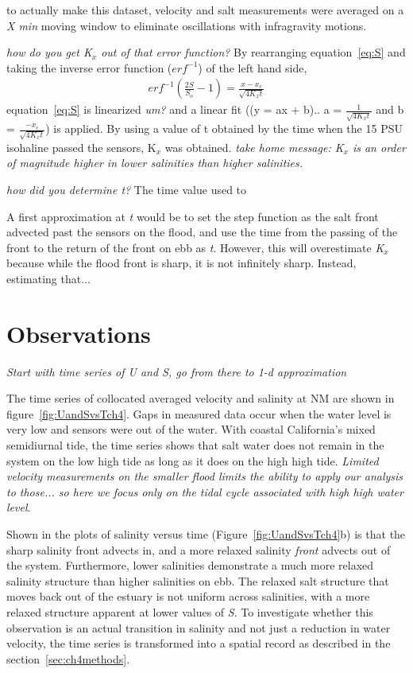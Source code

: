 to actually make this dataset, velocity and salt measurements were averaged on a \emph{X min} moving window to eliminate oscillations with infragravity motions. 

\emph{how do you get K$_x$ out of that error function?}
By rearranging equation~\ref{eq:S} and taking the inverse error function ($erf^{-1}$) of the left hand side, 
\begin{eqnarray}
erf^{-1}(\frac{2S}{S_o}-1) = \frac{x-x_c}{\sqrt{4K_xt}} \label{eq:linfitS}
\end{eqnarray}
equation~\ref{eq:S} is linearized \emph{um?} and a linear fit ((y = ax + b).. a = $\frac{1}{\sqrt{4K_xt}}$ and b = $\frac{-x_c}{\sqrt{4K_xt}}$) is applied. By using a value of t obtained by the time when the 15 PSU isohaline passed the sensors, K$_x$ was obtained.  \emph{take home message: K$_x$ is an order of magnitude higher in lower salinities than higher salinities. }


\emph{how did you determine t?}
The time value used to 

A first approximation at \emph{t} would be to set the step function as the salt front advected past the sensors on the flood, and use the time from the passing of the front to the return of the front on ebb as \emph{t}. However, this will overestimate \emph{K$_x$} because while the flood front is sharp, it is not infinitely sharp.  Instead, estimating that... 



\section{Observations}
\emph{Start with time series of U and S, go from there to 1-d approximation}

The time series of collocated averaged velocity and salinity at NM are shown in figure~\ref{fig:UandSvsTch4}. Gaps in measured data occur when the water level is very low and sensors were out of the water. With coastal California's mixed semidiurnal tide, the time series shows that salt water does not remain in the system on the low high tide as long as it does on the high high tide. \emph{Limited velocity measurements on the smaller flood limits the ability to apply our analysis to those... so here we focus only on the tidal cycle associated with high high water level}. 

Shown in the plots of salinity versus time (Figure~\ref{fig:UandSvsTch4}b) is that the sharp salinity front advects in, and a more relaxed salinity \emph{front} advects out of the system. Furthermore, lower salinities demonstrate a much more relaxed salinity structure than higher salinities on ebb. The relaxed salt structure that moves back out of the estuary is not uniform across salinities, with a more relaxed structure apparent at lower values of \emph{S}. To investigate whether this observation is an actual transition in salinity and not just a reduction in water velocity, the time series is transformed into a spatial record as described in the section~\ref{sec:ch4methods}. 

